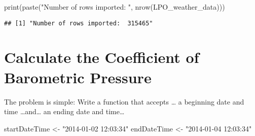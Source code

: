 \documentclass[
  11pt,
]{article}
\newenvironment{Shaded}{\begin{snugshade}}{\end{snugshade}}
\newcommand{\FunctionTok}[1]{\textcolor[rgb]{0.00,0.00,0.00}{#1}}
\newcommand{\NormalTok}[1]{#1}
\newcommand{\OtherTok}[1]{\textcolor[rgb]{0.56,0.35,0.01}{#1}}
\newcommand{\StringTok}[1]{\textcolor[rgb]{0.31,0.60,0.02}{#1}}
\begin{document}
\begin{table}
\centering
{}
\end{table}

\begin{Shaded}
\begin{Highlighting}[]
\FunctionTok{print}\NormalTok{(}\FunctionTok{paste}\NormalTok{(}\StringTok{"Number of rows imported: "}\NormalTok{, }\FunctionTok{nrow}\NormalTok{(LPO\_weather\_data)))}
\end{Highlighting}
\end{Shaded}

\begin{verbatim}
## [1] "Number of rows imported:  315465"
\end{verbatim}

\hypertarget{calculate-the-coefficient-of-barometric-pressure}{%
\section{Calculate the Coefficient of Barometric
Pressure}\label{calculate-the-coefficient-of-barometric-pressure}}

The problem is simple: Write a function that accepts \ldots{} a
beginning date and time \ldots and\ldots{} an ending date and
time\ldots{}

\begin{Shaded}
\begin{Highlighting}[]
\NormalTok{startDateTime }\OtherTok{\textless{}{-}} \StringTok{"2014{-}01{-}02 12:03:34"}
\NormalTok{endDateTime }\OtherTok{\textless{}{-}} \StringTok{"2014{-}01{-}04 12:03:34"}
\end{Highlighting}
\end{Shaded}
\end{document}
